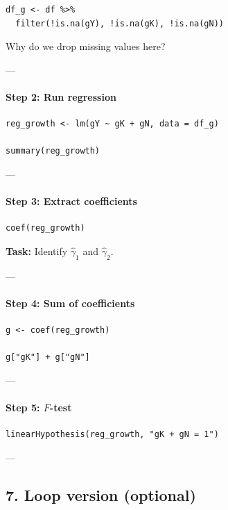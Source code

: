 \documentclass[12pt]{article}
\begin{document}
\begin{verbatim}
df_g <- df %>%
  filter(!is.na(gY), !is.na(gK), !is.na(gN))
\end{verbatim}

Why do we drop missing values here?

---

\paragraph{Step 2: Run regression}

\begin{verbatim}
reg_growth <- lm(gY ~ gK + gN, data = df_g)

summary(reg_growth)
\end{verbatim}

---

\paragraph{Step 3: Extract coefficients}

\begin{verbatim}
coef(reg_growth)
\end{verbatim}

\textbf{Task:} Identify $\hat{\gamma}_1$ and $\hat{\gamma}_2$.

---

\paragraph{Step 4: Sum of coefficients}

\begin{verbatim}
g <- coef(reg_growth)

g["gK"] + g["gN"]
\end{verbatim}

---

\paragraph{Step 5: $F$-test}

\begin{verbatim}
linearHypothesis(reg_growth, "gK + gN = 1")
\end{verbatim}

---

\subsection*{7. Loop version (optional)}
\end{document}
